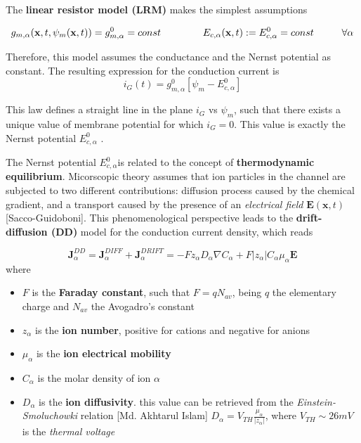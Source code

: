 \documentclass[a4paper]{article}
\begin{document}
The \textbf{linear resistor model (LRM)} makes the simplest assumptions 

\begin{equation}
	g_{m,\alpha}(\textbf{x},t,\psi_m(\textbf{x},t)) = g_{m,\alpha}^0 = const \hspace{1.5 cm} E_{c,\alpha}(\textbf{x},t) := E_{c,\alpha}^0 = const \hspace{1cm} \forall \alpha
\end{equation}

Therefore, this model assumes the conductance and the Nernst potential as constant.
The resulting expression for the conduction current is
\begin{equation}
	i_G(t) = g_{m,\alpha}^0 [\psi_m -  E_{c,\alpha}^0]
\end{equation}

This law defines a straight line in the plane $i_G$ vs $\psi_m$, such that there exists a unique value of membrane potential for which $i_G=0$. This value is exactly the Nernst potential $E_{c,\alpha}^0$ .


The Nernst potential $E_{c,\alpha}^0$is related to the concept of  \textbf{thermodynamic equilibrium}. Micorscopic theory assumes that ion particles in the channel are subjected to two different contributions: diffusion process caused by the chemical gradient, and a transport caused by the presence of an \textit{electrical field} $\textbf{E}(\textbf{x},t)$ [Sacco-Guidoboni]. This phenomenological perspective leads to the \textbf{drift-diffusion (DD)} model for the conduction current density, which reads

\begin{equation}
	\textbf{J}_{\alpha}^{DD} = \textbf{J}_{\alpha}^{DIFF} + \textbf{J}_{\alpha}^{DRIFT} = -Fz_{\alpha}D_{\alpha}\nabla C_{\alpha} + F|z_{\alpha}| C_{\alpha}\mu_{\alpha}\textbf{E}
\end{equation}
where 
\begin{itemize}
	
	\item $F$ is the \textbf{Faraday constant}, such that $F = q N_{av}$, being $q$ the elementary charge and $N_{av}$ the Avogadro's constant
	
	\item $z_{\alpha}$ is the \textbf{ion number}, positive for cations and negative for anions
	
	\item $\mu_{\alpha}$ is the \textbf{ion electrical mobility}
	
	\item $C_{\alpha}$ is the molar density of ion $\alpha$
	
	\item $D_{\alpha}$ is the \textbf{ion diffusivity}. this value can be retrieved from the \textit{Einstein-Smoluchowki} relation [Md. Akhtarul Islam] $D_{\alpha} = V_{TH}\frac{\mu_{\alpha}}{|z_{\alpha}|}$, where $ V_{TH} \sim 26 mV$ is the \textit{thermal voltage}
\end{itemize}
\end{document}
